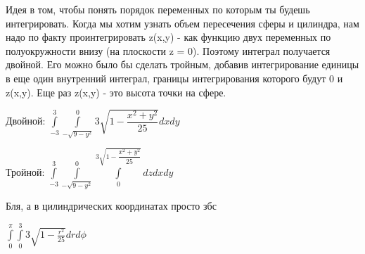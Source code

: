 \documentclass{article}
\begin{document}
Идея в том, чтобы понять порядок переменных по которым ты будешь интегрировать. Когда мы хотим узнать объем пересечения сферы и цилиндра, нам надо по факту проинтегрировать z(x,y) - как функцию двух переменных по полуокружности внизу (на плоскости z = 0). Поэтому интеграл получается двойной. Его можно было бы сделать тройным, добавив интегрирование единицы в еще один внутренний интеграл, границы интегрирования которого будут 0 и z(x,y). Еще раз z(x,y) - это высота точки на сфере.

Двойной: $\int\limits_{-3}^{3}{\int\limits_{-\sqrt{9 - y^2}}^0{3\sqrt{1 - \dfrac{x^2 + y^2}{25}}dx}dy}$

Тройной: $\int\limits_{-3}^{3}{\int\limits_{-\sqrt{9 - y^2}}^0{\int\limits_0^{3\sqrt{1 - \dfrac{x^2 + y^2}{25}}}{dz}dx}dy}$

Бля, а в цилиндрических координатах просто збс

$\int\limits_0^\pi{\int\limits_0^3{3 \sqrt{1 - \frac{r^2}{25}} dr}d \phi}$
\end{document}
